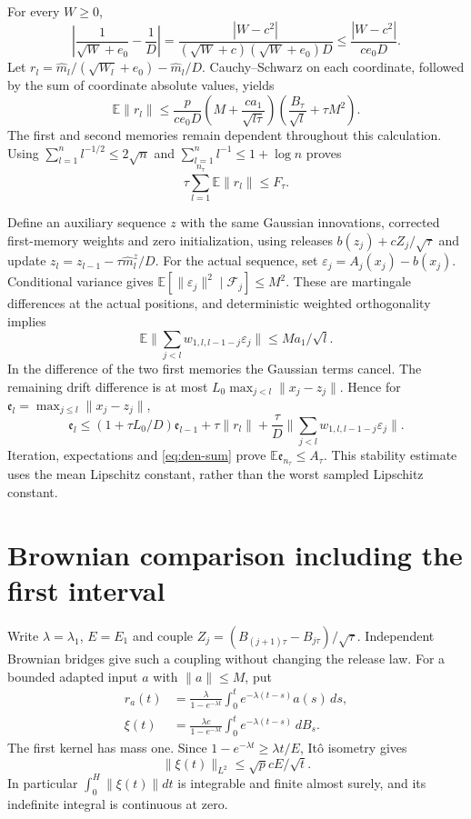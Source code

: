 \documentclass[a4paper,11pt]{article}
\theoremstyle{remark}
\newcommand{\E}{\mathbb E}
\newcommand{\norm}[1]{\lVert#1\rVert}
\newcommand{\Ltwo}[1]{\lVert#1\rVert_{L^2}}
\begin{document}
For every $W\ge0$,
\[
 \left|\frac1{\sqrt W+e_0}-\frac1D\right|
 =\frac{|W-c^2|}{(\sqrt W+c)(\sqrt W+e_0)D}
 \le\frac{|W-c^2|}{ce_0D}.
\]
Let $r_l=\widehat m_l/(\sqrt{W_l}+e_0)-\widehat m_l/D$.
Cauchy--Schwarz on each coordinate, followed by the sum of coordinate
absolute values, yields
\begin{equation}\label{eq:den-error}
 \E\norm{r_l}\le\frac p{ce_0D}
 \left(M+\frac{ca_1}{\sqrt{l\tau}}\right)
 \left(\frac{B_\tau}{\sqrt l}+\tau M^2\right).
\end{equation}
The first and second memories remain dependent throughout this calculation.
Using $\sum_{l=1}^n l^{-1/2}\le2\sqrt n$ and
$\sum_{l=1}^n l^{-1}\le1+\log n$ proves
\begin{equation}\label{eq:den-sum}
 \tau\sum_{l=1}^{n_\tau}\E\norm{r_l}\le F_\tau.
\end{equation}

Define an auxiliary sequence $z$ with the same Gaussian innovations,
corrected first-memory weights and zero initialization, using releases
$b(z_j)+cZ_j/\sqrt\tau$ and update
$z_l=z_{l-1}-\tau\widehat m_l^z/D$.
For the actual sequence, set $\varepsilon_j=A_j(x_j)-b(x_j)$.
Conditional variance gives
$\E[\norm{\varepsilon_j}^2\mid\mathcal F_j]\le M^2$.
These are martingale differences at the actual positions, and deterministic
weighted orthogonality implies
\[
 \E\norm{\sum_{j<l}w_{1,l,l-1-j}\varepsilon_j}\le Ma_1/\sqrt l.
\]
In the difference of the two first memories the Gaussian terms cancel.
The remaining drift difference is at most
$L_0\max_{j<l}\norm{x_j-z_j}$. Hence for
$\mathfrak e_l=\max_{j\le l}\norm{x_j-z_j}$,
\[
 \mathfrak e_l\le(1+\tau L_0/D)\mathfrak e_{l-1}+\tau\norm{r_l}
    +\frac\tau D\norm{\sum_{j<l}w_{1,l,l-1-j}\varepsilon_j}.
\]
Iteration, expectations and \eqref{eq:den-sum} prove
$\E \mathfrak e_{n_\tau}\le A_\tau$. This stability estimate uses the mean
Lipschitz constant, rather than the worst sampled Lipschitz constant.

\section{Brownian comparison including the first interval}\label{app:sde}

Write $\lambda=\lambda_1$, $E=E_1$ and couple
$Z_j=(B_{(j+1)\tau}-B_{j\tau})/\sqrt\tau$. Independent Brownian bridges
give such a coupling without changing the release law. For a bounded
adapted input $a$ with $\norm a\le M$, put
\begin{align*}
 r_a(t)&=\frac\lambda{1-e^{-\lambda t}}
              \int_0^te^{-\lambda(t-s)}a(s)\,ds,\\
 \xi(t)&=\frac{\lambda c}{1-e^{-\lambda t}}
              \int_0^te^{-\lambda(t-s)}\,dB_s.
\end{align*}
The first kernel has mass one. Since
$1-e^{-\lambda t}\ge\lambda t/E$, It\^o isometry gives
\begin{equation}\label{eq:noise-start}
 \Ltwo{\xi(t)}\le\sqrt p cE/\sqrt t.
\end{equation}
In particular $\int_0^H\norm{\xi(t)}dt$ is integrable and finite almost
surely, and its indefinite integral is continuous at zero.
\end{document}
